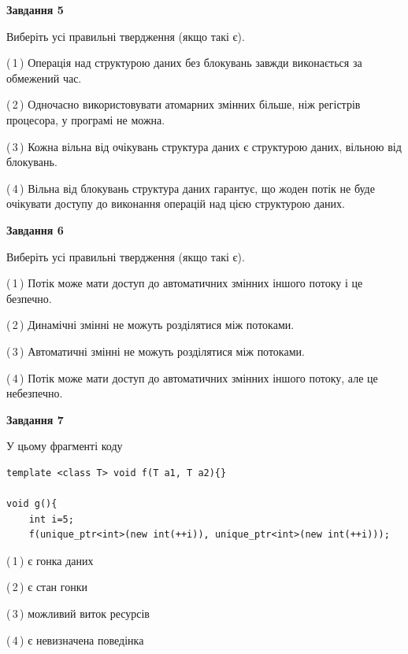 \documentclass[12pt, ukrainian]{article}
\begin{document}
\begin {large}
{\begin{center}
\textbf{Завдання 5}
\end{center}

Виберіть усі правильні твердження (якщо такі є).\par
\vspace{2mm}

(\,1\,) Операція над структурою даних без блокувань завжди виконається за обмежений час.%

(\,2\,) Одночасно використовувати атомарних змінних більше, ніж регістрів процесора, у програмі не можна.%

(\,3\,) Кожна вільна від очікувань структура даних є структурою даних, вільною від блокувань.%

(\,4\,) Вільна від блокувань структура даних гарантує, що жоден потік не буде очікувати доступу до виконання операцій над цією структурою даних.%
\newpage


\begin{center}
\textbf{Завдання 6}
\end{center}

Виберіть усі правильні твердження (якщо такі є).\par
\vspace{2mm}

(\,1\,) Потік може мати доступ до автоматичних змінних іншого потоку і це безпечно.%

(\,2\,) Динамічні змінні не можуть розділятися між потоками.%

(\,3\,) Автоматичні змінні не можуть розділятися між потоками.%

(\,4\,) Потік може мати доступ до автоматичних змінних іншого потоку, але це небезпечно.%


\begin{center}
\textbf{Завдання 7}
\end{center}

У цьому фрагменті коду
\begin{verbatim}
template <class T> void f(T a1, T a2){}

void g(){
    int i=5;
    f(unique_ptr<int>(new int(++i)), unique_ptr<int>(new int(++i)));
\end{verbatim}

(\,1\,) є гонка даних%

(\,2\,) є стан гонки%

(\,3\,) можливий виток ресурсів%

(\,4\,) є невизначена поведінка%

}
\end {large}

\vspace{4mm}
\newpage
\end{document}
